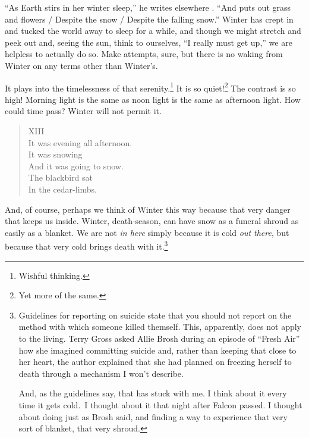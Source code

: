 \documentclass[12pt]{memoir}
\begin{document}
``As Earth stirs in her winter sleep,'' he writes elsewhere \parencite[173]{graves_poems}. ``And puts out grass and flowers / Despite the snow / Despite the falling snow.'' Winter has crept in and tucked the world away to sleep for a while, and though we might stretch and peek out and, seeing the sun, think to ourselves, ``I really must get up,'' we are helpless to actually do so. Make attempts, sure, but there is no waking from Winter on any terms other than Winter's.

It plays into the timelessness of that serenity.\footnote{Wishful thinking.} It is so quiet!\footnote{Yet more of the same.} The contrast is so high! Morning light is the same as noon light is the same as afternoon light. How could time pass? Winter will not permit it.

\begin{verse}
XIII \\
It was evening all afternoon. \\
It was snowing \\
And it was going to snow. \\
The blackbird sat \\
In the cedar-limbs.

\parencite{blackbird}
\end{verse}

And, of course, perhaps we think of Winter this way because that very danger that keeps us inside. Winter, death-season, can have snow as a funeral shroud as easily as a blanket. We are not \emph{in here} simply because it is cold \emph{out there}, but because that very cold brings death with it.\footnote{Guidelines for reporting on suicide state that you should not report on the method with which someone killed themself. This, apparently, does not apply to the living. Terry Gross asked Allie Brosh during an episode of ``Fresh Air'' how she imagined committing suicide and, rather than keeping that close to her heart, the author explained that she had planned on freezing herself to death through a mechanism I won't describe.\par And, as the guidelines say, that has stuck with me. I think about it every time it gets cold.\footnotemark~I thought about it that night after Falcon passed. I thought about doing just as Brosh said, and finding a way to experience that very sort of blanket, that very shroud.}
\end{document}
